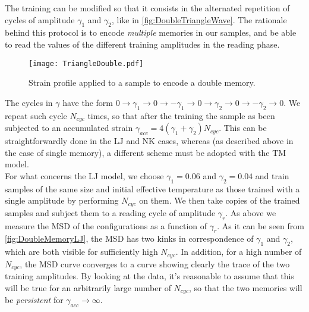 The training can be modified so that it consists in the alternated repetition of cycles of amplitude $\gamma_{1}$ and $\gamma_{2}$, like in \autoref{fig:DoubleTriangleWave}. The rationale behind this protocol is to encode \emph{multiple} memories in our samples, and be able to read the values of the different training amplitudes in the reading phase.
\begin{figure} 
\centering 
\texttt{[image: TriangleDouble.pdf]} 
\caption{Strain profile applied to a sample to encode a double memory.\label{fig:DoubleTriangleWave}}
\end{figure}
The cycles in $\gamma$ have the form $0 \rightarrow \gamma_{1} \rightarrow 0 \rightarrow  -\gamma_{1} \rightarrow 0 \rightarrow \gamma_{2} \rightarrow 0 \rightarrow  -\gamma_{2} \rightarrow 0$. 
We repeat such cycle $N_{cyc}$ times, so that after the training the sample as been subjected to an accumulated strain $\gamma_{acc} = 4(\gamma_{1} + \gamma_{2})N_{cyc}$. This can be straightforwardly done in the LJ and NK cases, whereas (as described above in the case of single memory), a different scheme must be adopted with the TM model. \\
For what concerns the LJ model, we choose $\gamma_{1} = 0.06$ and $\gamma_{2} = 0.04$ and train samples of the same size and initial effective temperature as those trained with a single amplitude by performing $N_{cyc}$ on them. We then take copies of the trained samples and subject them to a reading cycle of amplitude $\gamma_{r}$. As above we measure the MSD of the configurations as a function of $\gamma_{r}$. As it can be seen from \autoref{fig:DoubleMemoryLJ}, the MSD has two kinks in correspondence of $\gamma_{1}$ and $\gamma_{2}$, which are both visible for sufficiently high $N_{cyc}$. In addition, for a high number of $N_{cyc}$, the MSD curve converges to a curve showing clearly the trace of the two training amplitudes. By looking at the data, it's reasonable to assume that this will be true for an arbitrarily large number of $N_{cyc}$, so that the two memories will be \emph{persistent} for $\gamma_{acc} \rightarrow \infty$.

